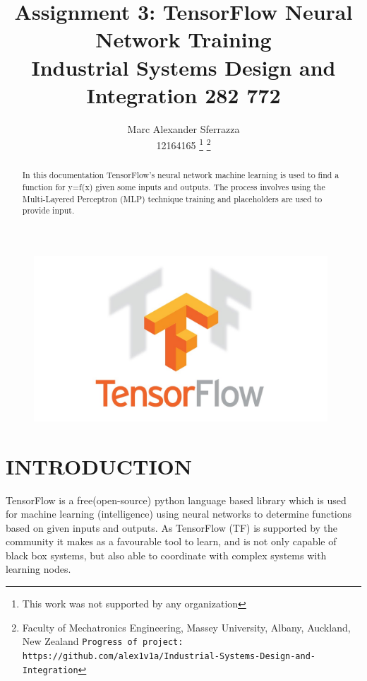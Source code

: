 \documentclass[a4paper, 10pt]{IEEEconf}
\title{\LARGE \bf Assignment 3: TensorFlow Neural Network Training\\Industrial Systems Design and Integration 282 772}
\author{Marc Alexander Sferrazza \\ 12164165
\thanks{This work was not supported by any organization}
\thanks{Faculty of Mechatronics Engineering, Massey University, Albany, Auckland, New Zealand
        {\tt\small Progress of project: https://github.com/alex1v1a/Industrial-Systems-Design-and-Integration} } }
\begin{document}
\maketitle
\begin{figure}[H]
  \begin{center}
  \includegraphics[width=110mm]{images/tf}
  \label{fig:kinetic}
  \end{center}
\end{figure}
\thispagestyle{empty}
\pagestyle{plain}



\begin{abstract}
In this documentation TensorFlow's neural network machine learning is used to find a function for y=f(x) given some inputs and outputs. The process involves using the Multi-Layered Perceptron (MLP) technique training and placeholders are used to provide input.
\end{abstract}


\clearpage
\thispagestyle{empty}
\tableofcontents
\begingroup
\let\clearpage\relax
\listoffigures
\endgroup
\clearpage
\twocolumn

\clearpage
\setcounter{page}{1}
\onecolumn

\section{INTRODUCTION}

TensorFlow is a free(open-source) python language based library which is used for machine learning (intelligence) using neural networks to determine functions based on given inputs and outputs\cite{ML}. As TensorFlow (TF) is supported by the community it makes as a favourable tool to learn, and is not only capable of black box systems, but also able to coordinate with complex systems with learning nodes.
\end{document}
